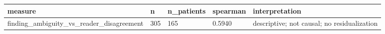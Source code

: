 \begin{tabular}{lllll}
\hline
measure & n & n\_patients & spearman & interpretation \\
\hline
finding\_ambiguity\_vs\_reader\_disagreement & 305 & 165 & 0.5940 & descriptive; not causal; no residualization \\
\hline
\end{tabular}
